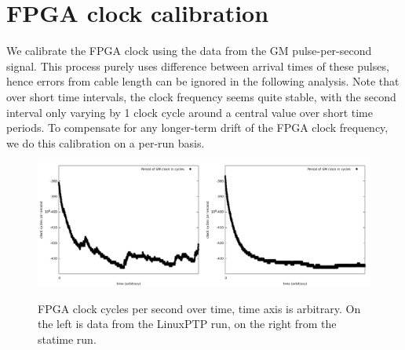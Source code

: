 \documentclass{article}
\begin{document}
\section{FPGA clock calibration}

We calibrate the FPGA clock using the data from the GM pulse-per-second signal. This process purely uses difference between arrival times of these pulses, hence errors from cable length can be ignored in the following analysis. Note that over short time intervals, the clock frequency seems quite stable, with the second interval only varying by 1 clock cycle around a central value over short time periods. To compensate for any longer-term drift of the FPGA clock frequency, we do this calibration on a per-run basis.

\begin{figure}[h]
\includegraphics[width=0.5\textwidth]{gm_secs_overtime_ref.pdf}\includegraphics[width=0.5\textwidth]{gm_secs_overtime_statime.pdf}
\caption{FPGA clock cycles per second over time, time axis is arbitrary. On the left is data from the LinuxPTP run, on the right from the statime run.}
\label{fig:gm_cycles_over_time}
\end{figure}
\end{document}
